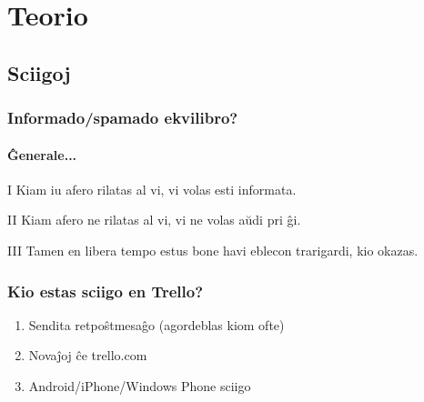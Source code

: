 \section{Teorio}

\subsection{Sciigoj}

  \begin{frame}
    \frametitle{Informado/spamado ekvilibro?}
	\framesubtitle{Ĝenerale...}	
	\begin{block}{I}
		Kiam iu afero rilatas al vi, vi volas esti informata.
	\end{block}
	\begin{block}{II}
		Kiam afero ne rilatas al vi, vi ne volas aŭdi pri ĝi.
	\end{block}
	\begin{block}{III}
		Tamen en libera tempo estus bone havi eblecon trarigardi, kio okazas.
	\end{block}
	
  \end{frame}


  \begin{frame}
    \frametitle{Kio estas sciigo en Trello?}

	\begin{enumerate}
		\item Sendita retpoŝtmesaĝo (\alert{agordeblas kiom ofte})
		\item Novaĵoj ĉe trello.com
		\item Android/iPhone/Windows Phone sciigo
	\end{enumerate}
	
  \end{frame}


